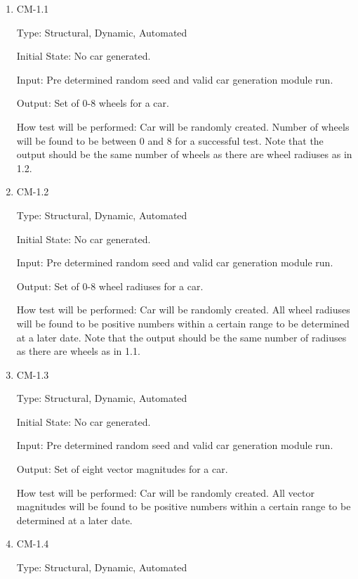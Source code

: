\documentclass[12pt, titlepage]{article}
\begin{document}
\begin{enumerate}

\item{CM-1.1\\}

Type: Structural, Dynamic, Automated
					
Initial State: No car generated.
					
Input: Pre determined random seed and valid car generation module run.
					
Output: Set of 0-8 wheels for a car.
					
How test will be performed: Car will be randomly created. Number of wheels will be found to be between 0 and 8 for a successful test. Note that the output should be the same number of wheels as there are wheel radiuses as in 1.2.

\item{CM-1.2\\}

Type: Structural, Dynamic, Automated
					
Initial State: No car generated.
					
Input: Pre determined random seed and valid  car generation module run.
					
Output: Set of 0-8 wheel radiuses for a car.
					
How test will be performed: Car will be randomly created. All wheel radiuses will be found to be positive numbers within a certain range to be determined at a later date. Note that the output should be the same number of radiuses as there are wheels as in 1.1.

\item{CM-1.3\\}

Type: Structural, Dynamic, Automated
					
Initial State: No car generated.
					
Input: Pre determined random seed and valid  car generation module run.
					
Output: Set of eight vector magnitudes for a car.
					
How test will be performed: Car will be randomly created. All vector magnitudes will be found to be positive numbers within a certain range to be determined at a later date.

\item{CM-1.4\\}

Type: Structural, Dynamic, Automated
					

\end{enumerate}
\end{document}
